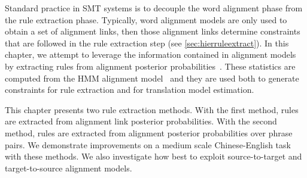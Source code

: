 Standard practice in SMT systems is to decouple the word alignment phase from
the rule extraction phase. Typically, word alignment models are only used to
obtain a set of alignment links, then those alignment links determine
constraints that are followed in the rule extraction
step (see \autoref{sec:hierruleextract}). In
this chapter, we attempt to leverage the information
contained in alignment models by extracting rules from alignment posterior
probabilities~\citep{degispert-pino-byrne:2010:EMNLP}. These statistics are
computed from the HMM alignment model~\citep{vogel-ney-tillmann} and they
are used
both to generate constraints for rule extraction and for translation model
estimation.

This chapter presents two rule extraction methods. With the first method, rules
are extracted from alignment link posterior probabilities. With the second
method, rules are extracted from alignment posterior probabilities
over phrase pairs. We
demonstrate improvements on a medium scale Chinese-English task with these
methods. We also investigate how best to exploit source-to-target and
target-to-source alignment models.



